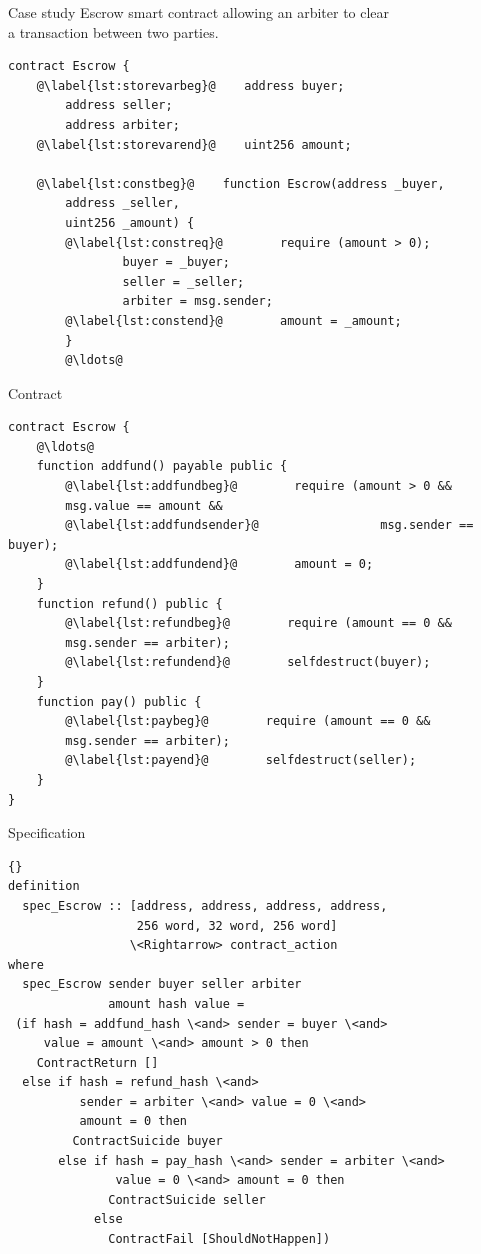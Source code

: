 \documentclass{beamer}
\begin{document}
\begin{frame}[fragile]{Case study}
Escrow smart contract allowing an arbiter to clear\\
a transaction between two parties.\\
		\begin{lstlisting}[language=Solidity]
contract Escrow {
	@\label{lst:storevarbeg}@    address buyer;
	    address seller;
	    address arbiter;
	@\label{lst:storevarend}@    uint256 amount;
	
	@\label{lst:constbeg}@    function Escrow(address _buyer,
	    address _seller,
	    uint256 _amount) {
		@\label{lst:constreq}@        require (amount > 0);
		        buyer = _buyer;
		        seller = _seller;
		        arbiter = msg.sender;
		@\label{lst:constend}@        amount = _amount;
	    }
	    @\ldots@
	\end{lstlisting}
\end{frame}

\begin{frame}[fragile]{Contract}
		\begin{lstlisting}[language=Solidity]
contract Escrow {
    @\ldots@
    function addfund() payable public {
		@\label{lst:addfundbeg}@        require (amount > 0 &&
        msg.value == amount &&
		@\label{lst:addfundsender}@                 msg.sender == buyer);
		@\label{lst:addfundend}@        amount = 0;
    }
    function refund() public {
		@\label{lst:refundbeg}@        require (amount == 0 &&
        msg.sender == arbiter);
		@\label{lst:refundend}@        selfdestruct(buyer);
    }
    function pay() public {
		@\label{lst:paybeg}@        require (amount == 0 &&
        msg.sender == arbiter);
		@\label{lst:payend}@        selfdestruct(seller);
    }
}
		\end{lstlisting}
\end{frame}

\begin{frame}[fragile]{Specification}
\begin{lstlisting}[language=Isar,keywords={[3]{addfund\_hash,pay\_hash,refund\_hash,}}]{} 
definition 
  spec_Escrow :: [address, address, address, address, 
                  256 word, 32 word, 256 word]
                 \<Rightarrow> contract_action
where
  spec_Escrow sender buyer seller arbiter 
              amount hash value =
 (if hash = addfund_hash \<and> sender = buyer \<and>
     value = amount \<and> amount > 0 then
    ContractReturn []
  else if hash = refund_hash \<and>
          sender = arbiter \<and> value = 0 \<and>
          amount = 0 then
         ContractSuicide buyer
       else if hash = pay_hash \<and> sender = arbiter \<and>
               value = 0 \<and> amount = 0 then
              ContractSuicide seller
            else
              ContractFail [ShouldNotHappen])
		\end{lstlisting}
\end{frame}
	
\end{document}
